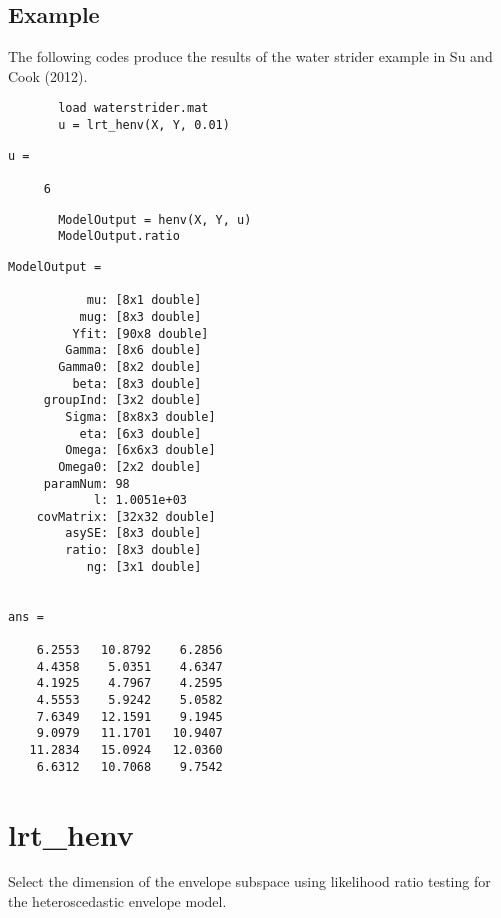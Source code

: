\documentclass[a4paper,11pt,openany]{memoir}
\begin{document}
\subsection*{Example}

\begin{par}
The following codes produce the results of the water strider example in Su and Cook (2012).
\end{par} \vspace{1em}

\begin{verbatim}       load waterstrider.mat
       u = lrt_henv(X, Y, 0.01)
       \end{verbatim}
               \color{lightgray}\ttfamily \begin{verbatim}
u =

     6
\end{verbatim} \rmfamily
\color{black}
\begin{verbatim}       ModelOutput = henv(X, Y, u)
       ModelOutput.ratio\end{verbatim}

 \color{lightgray}\ttfamily \begin{verbatim}
ModelOutput = 

           mu: [8x1 double]
          mug: [8x3 double]
         Yfit: [90x8 double]
        Gamma: [8x6 double]
       Gamma0: [8x2 double]
         beta: [8x3 double]
     groupInd: [3x2 double]
        Sigma: [8x8x3 double]
          eta: [6x3 double]
        Omega: [6x6x3 double]
       Omega0: [2x2 double]
     paramNum: 98
            l: 1.0051e+03
    covMatrix: [32x32 double]
        asySE: [8x3 double]
        ratio: [8x3 double]
           ng: [3x1 double]


ans =

    6.2553   10.8792    6.2856
    4.4358    5.0351    4.6347
    4.1925    4.7967    4.2595
    4.5553    5.9242    5.0582
    7.6349   12.1591    9.1945
    9.0979   11.1701   10.9407
   11.2834   15.0924   12.0360
    6.6312   10.7068    9.7542

\end{verbatim} \rmfamily
\color{black}
    
\newpage
    
\rmfamily
\color{black}\section{lrt\_henv}

\begin{par}
Select the dimension of the envelope subspace using likelihood ratio testing for the heteroscedastic envelope model.
\end{par} \vspace{1em}
\end{document}
